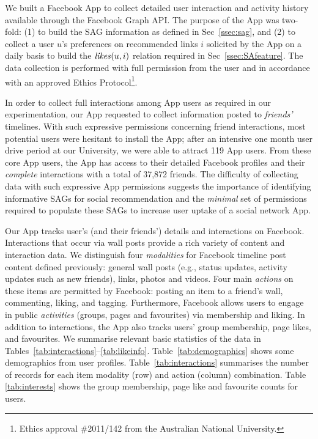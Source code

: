 
We built a Facebook App to collect detailed user interaction and
activity history available through the Facebook Graph API.  The
purpose of the App was two-fold: (1) to build the SAG information as
defined in Sec~\ref{ssec:sag}, and (2) to collect a user $u$'s preferences on
recommended links $i$ solicited by the App on a daily basis to build
the $\likes(u,i)$ relation required in Sec~\ref{ssec:SAfeature}.  The
data collection is performed with full permission from the user and in
accordance with an approved Ethics Protocol\footnote{Ethics approval 
\#2011/142 from the Australian National University.}.

In order to collect full interactions among App users as required in
our experimentation, our App requested to collect information posted
to \emph{friends'} timelines.  With such expressive permissions
concerning friend interactions, most potential users were hesitant to
install the App; after an intensive one month user drive period at our
University, we were able to attract 119 App users.  From these core
App users, the App has access to their detailed Facebook profiles and
their \emph{complete} interactions with a total of 37,872 friends.
The difficulty of collecting data with such expressive App permissions
suggests the importance of identifying informative SAGs for social
recommendation and the \emph{minimal} set of permissions required to
populate these SAGs to increase user uptake of a social network 
App.

Our App tracks user's (and their friends') details and interactions on
Facebook.  Interactions that occur via wall posts provide a rich
variety of content and interaction data.  We distinguish
four \emph{modalities} for Facebook timeline post content defined previously:
general wall posts (e.g., status updates, activity updates such as new
friends), links, photos and videos. Four main \emph{actions} on these
items are permitted by Facebook: posting an item to a friend's wall,
commenting, liking, and tagging. Furthermore, Facebook allows users to
engage in public \emph{activities} (groups, pages and favourites) via membership
and liking. In addition to interactions, the App also tracks users'
group membership, page likes, and favourites.
We summarise relevant basic statistics of the data in
Tables~\ref{tab:interactions}--\ref{tab:likeinfo}.
Table~\ref{tab:demographics} shows some demographics from user
profiles.  Table~\ref{tab:interactions} summarises the number of
records for each item modality (row) and action (column)
combination. Table \ref{tab:interests} shows the group membership,
page like and favourite counts for users.

